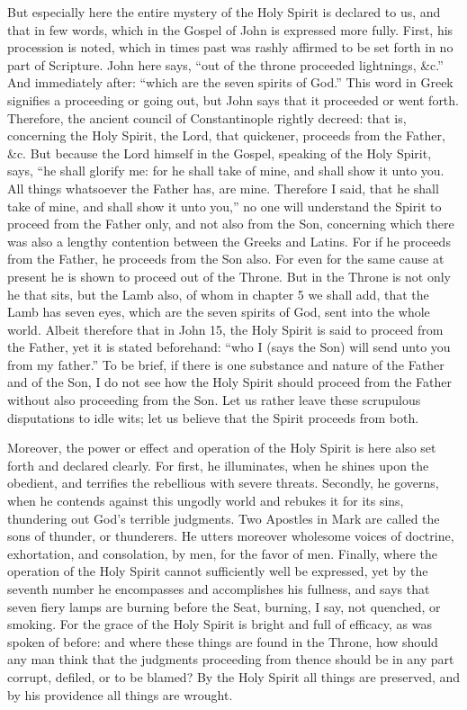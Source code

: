 But especially here the entire mystery of the Holy Spirit is declared to us, and that in few words, which in the Gospel of John is expressed more fully. First, his procession is noted, which in times past was rashly affirmed to be set forth in no part of Scripture. John here says, “out of the throne proceeded lightnings, \&c.” And immediately after: “which are the seven spirits of God.” This word in Greek signifies a proceeding or going out, but John says that it proceeded or went forth. Therefore, the ancient council of Constantinople rightly decreed: that is, concerning the Holy Spirit, the Lord, that quickener, proceeds from the Father, \&c. But because the Lord himself in the Gospel, speaking of the Holy Spirit, says, “he shall glorify me: for he shall take of mine, and shall show it unto you. All things whatsoever the Father has, are mine. Therefore I said, that he shall take of mine, and shall show it unto you,” no one will understand the Spirit to proceed from the Father only, and not also from the Son, concerning which there was also a lengthy contention between the Greeks and Latins. For if he proceeds from the Father, he proceeds from the Son also. For even for the same cause at present he is shown to proceed out of the Throne. But in the Throne is not only he that sits, but the Lamb also, of whom in chapter 5 we shall add, that the Lamb has seven eyes, which are the seven spirits of God, sent into the whole world. Albeit therefore that in John 15, the Holy Spirit is said to proceed from the Father, yet it is stated beforehand: “who I (says the Son) will send unto you from my father.” To be brief, if there is one substance and nature of the Father and of the Son, I do not see how the Holy Spirit should proceed from the Father without also proceeding from the Son. Let us rather leave these scrupulous disputations to idle wits; let us believe that the Spirit proceeds from both.

Moreover, the power or effect and operation of the Holy Spirit is here also set forth and declared clearly. For first, he illuminates, when he shines upon the obedient, and terrifies the rebellious with severe threats. Secondly, he governs, when he contends against this ungodly world and rebukes it for its sins, thundering out God’s terrible judgments. Two Apostles in Mark are called the sons of thunder, or thunderers. He utters moreover wholesome voices of doctrine, exhortation, and consolation, by men, for the favor of men. Finally, where the operation of the Holy Spirit cannot sufficiently well be expressed, yet by the seventh number he encompasses and accomplishes his fullness, and says that seven fiery lamps are burning before the Seat, burning, I say, not quenched, or smoking. For the grace of the Holy Spirit is bright and full of efficacy, as was spoken of before: and where these things are found in the Throne, how should any man think that the judgments proceeding from thence should be in any part corrupt, defiled, or to be blamed? By the Holy Spirit all things are preserved, and by his providence all things are wrought.

